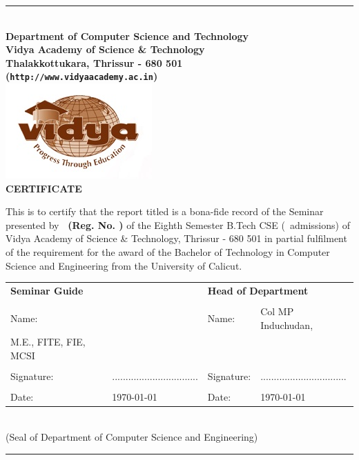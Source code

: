 %
\begin{center}
\hrule
\quad\\[0.75cm]
{\Large \bf Department of Computer Science and Technology}\\
{\large \bf Vidya Academy of Science \& Technology}\\
{\normalsize \bf Thalakkottukara, Thrissur - 680 501\\
({\tt http://www.vidyaacademy.ac.in})}\\[0.5cm]
\includegraphics{VidyaLogo}\\[1.25cm]
%
{\Large \bf CERTIFICATE}\\[1cm]
%
\end{center}
This is to certify that the report titled 
{\bf \vtitle} is a bona-fide record of the 
Seminar presented by {\bf \vauthor\  
(Reg. No. \vregisternumber)}    of the Eighth 
Semester B.Tech CSE (\vadmissionyear\ admissions) 
of Vidya Academy of Science \& Technology, 
Thrissur - 680 501 in partial fulfilment of the 
requirement for the award of the Bachelor of Technology in Computer Science and Engineering from the University of 
Calicut.\\[0.1cm]
%
\begin{center}
\begin{tabular}{llll}
\multicolumn{2}{l}{\bf Seminar Guide}    
&\multicolumn{2}{l}{\bf Head of Department}   \\
  & & & \\
Name: &  \vguide\ & Name: & Col MP Induchudan,\\ M.E., FITE, FIE, MCSI \\
 & & & \\
Signature: \quad &  ................................
\qquad \qquad & Signature: \quad &  
................................ \\
& & & \\
Date: & \today & Date: &\today \\
\end{tabular}
\\[1cm]
{\small (Seal of Department of Computer Science and Engineering)}
\quad \\[0.75cm]
\hrule
\end{center} 
%
\vspace*{\fill}
